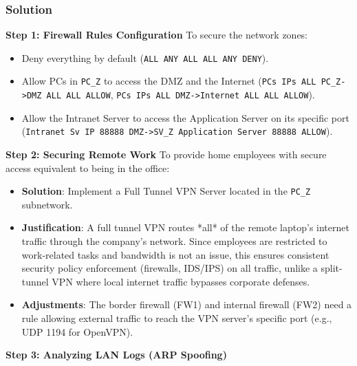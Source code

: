 \documentclass{article}
\begin{document}
\subsubsection*{Solution}
\textbf{Step 1: Firewall Rules Configuration}
To secure the network zones:
\begin{itemize}
    \item[\textbf{1.}] Deny everything by default (\texttt{ALL ANY ALL ALL ANY DENY}).
    \item[\textbf{2.}] Allow PCs in \texttt{PC\_Z} to access the DMZ and the Internet (\texttt{PCs IPs ALL PC\_Z->DMZ ALL ALL ALLOW}, \texttt{PCs IPs ALL DMZ->Internet ALL ALL ALLOW}).
    \item[\textbf{3.}] Allow the Intranet Server to access the Application Server on its specific port (\texttt{Intranet Sv IP 88888 DMZ->SV\_Z Application Server 88888 ALLOW}).

\end{itemize}
\textbf{Step 2: Securing Remote Work}
To provide home employees with secure access equivalent to being in the office:
\begin{itemize}
    \item \textbf{Solution}: Implement a Full Tunnel VPN Server located in the \texttt{PC\_Z} subnetwork.
    \item \textbf{Justification}: A full tunnel VPN routes *all* of the remote laptop's internet traffic through the company's network. Since employees are restricted to work-related tasks and bandwidth is not an issue, this ensures consistent security policy enforcement (firewalls, IDS/IPS) on all traffic, unlike a split-tunnel VPN where local internet traffic bypasses corporate defenses.
    \item \textbf{Adjustments}: The border firewall (FW1) and internal firewall (FW2) need a rule allowing external traffic to reach the VPN server's specific port (e.g., UDP 1194 for OpenVPN).

\end{itemize}
\textbf{Step 3: Analyzing LAN Logs (ARP Spoofing)}
\end{document}
